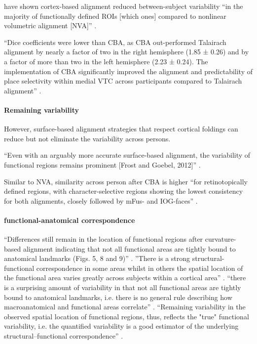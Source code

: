 
\citet{rosenke2021probabilistic} have shown cortex-based alignment reduced
between-subject variability ``in the majority of functionally defined ROIs
[which ones] compared to nonlinear volumetric alignment [NVA]''
\citep{rosenke2021probabilistic}.




``Dice coefficients were lower than CBA, as CBA out-performed Talairach
alignment by nearly a factor of two in the right hemisphere (1.85 ± 0.26) and by
a factor of more than two in the left hemisphere (2.23 ± 0.24).
%
The implementation of CBA significantly improved the alignment and
predictability of place selectivity within medial VTC across participants
compared to Talairach alignment'' \citep{weiner2018defining}.


\paragraph{Remaining variability}
%
However, surface-based alignment strategies that respect cortical foldings
\citep{fischl2012freesurfer, yeo2009spherical} can reduce but not eliminate
\citep[e.g.,][]{coalson2018impact, benson2014correction, natu2021sulcal,
wang2015probabilistic, frost2012measuring, langers2014assessment, weiner2014mid,
rosenke2021probabilistic} the variability across persons.

``Even with an arguably more accurate surface-based alignment, the variability
of functional regions remains prominent  [Frost and Goebel, 2012]''
\citep{zhen2015quantifying}.

Similar to NVA, similarity across person after CBA is higher ``for
retinotopically defined regions, with character-selective regions showing the
lowest consistency for both alignments, closely followed by mFus- and
IOG-faces'' \citep{rosenke2021probabilistic}.


\paragraph{functional-anatomical correspondence}
%
``Differences still remain in the location of functional regions after
curvature-based alignment indicating that not all functional areas are tightly
bound to anatomical landmarks (Figs. 5, 8 and 9)'' \citep{frost2012measuring}.
%
''There is a strong structural-functional correspondence in some areas whilst in
others the spatial location of the functional area varies greatly across
subjects within a cortical area'' \citep{frost2012measuring}.
%
``there is a surprising amount of variability in that not all
functional areas are tightly bound to anatomical landmarks, i.e. there is no
general rule describing how macroanatomical and functional areas correlate''
\citep{frost2012measuring}.
%
``Remaining variability in the observed spatial location of functional regions,
thus, reflects the "true" functional variability, i.e. the quantified
variability is a good estimator of the underlying structural–functional
correspondence'' \citep{frost2012measuring}.

